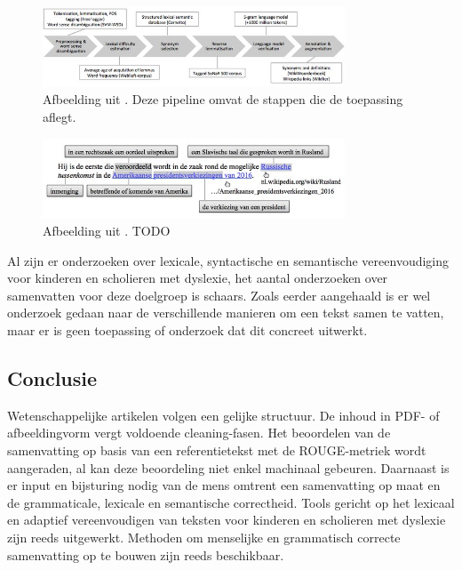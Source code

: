 \begin{figure}[H]
	\begin{center}
			\includegraphics[width=9cm]{img/dutch-simplification-dyslexia-pipeline.png}
	\end{center}
	\caption{Afbeelding uit \textcite{Bulte2018}. Deze pipeline omvat de stappen die de toepassing aflegt. }
\end{figure}

\begin{figure}[H]
	\begin{center}
			\includegraphics[width=9cm]{img/dutch-simplification-dyslexia-example.png}
	\end{center}
	\caption{Afbeelding uit \textcite{Bulte2018}. TODO}
\end{figure}


Al zijn er onderzoeken over lexicale, syntactische en semantische vereenvoudiging voor kinderen en scholieren met dyslexie, het aantal onderzoeken over samenvatten voor deze doelgroep is schaars. Zoals eerder aangehaald is er wel onderzoek gedaan naar de verschillende manieren om een tekst samen te vatten, maar er is geen toepassing of onderzoek dat dit concreet uitwerkt. 


\subsection{Conclusie}

Wetenschappelijke artikelen volgen een gelijke structuur. De inhoud in PDF- of afbeeldingvorm vergt voldoende cleaning-fasen. Het beoordelen van de samenvatting op basis van een referentietekst met de ROUGE-metriek wordt aangeraden, al kan deze beoordeling niet enkel machinaal gebeuren. Daarnaast is er input en bijsturing nodig van de mens omtrent een samenvatting op maat en de grammaticale, lexicale en semantische correctheid. Tools gericht op het lexicaal en adaptief vereenvoudigen van teksten voor kinderen en scholieren met dyslexie zijn reeds uitgewerkt. Methoden om menselijke en grammatisch correcte samenvatting op te bouwen zijn reeds beschikbaar. 

